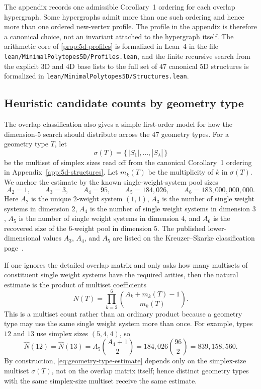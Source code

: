 \begin{remark}
The appendix records one admissible Corollary~1 ordering for each overlap
hypergraph.  Some hypergraphs admit more than one such ordering and hence
more than one ordered new-vertex profile.  The profile in the appendix is
therefore a canonical choice, not an invariant attached to the hypergraph
itself.  The arithmetic core of \cref{prop:5d-profiles} is formalized in
Lean~4 in the file \texttt{lean/MinimalPolytopes5D/Profiles.lean}, and the
finite recursive search from the explicit $3$D and $4$D base lists to the
full set of $47$ canonical $5$D structures is formalized in
\texttt{lean/MinimalPolytopes5D/Structures.lean}.
\end{remark}

\subsection{Heuristic candidate counts by geometry type}
\label{subsec:5d-cws-estimates}

The overlap classification also gives a simple first-order model for how
the dimension-$5$ search should distribute across the $47$ geometry types.
For a geometry type $T$, let
\[
  \sigma(T) = \{\, |S_1|, \dots, |S_\lambda| \,\}
\]
be the multiset of simplex sizes read off from the canonical Corollary~1
ordering in Appendix~\ref{app:5d-structures}.  Let $m_k(T)$ be the
multiplicity of $k$ in $\sigma(T)$.  We anchor the estimate by the known
single-weight-system pool sizes
\begin{equation}
\label{eq:arity-pool-sizes}
  A_2 = 1,\qquad A_3 = 3,\qquad A_4 = 95,\qquad
  A_5 = 184{,}026,\qquad A_6 = 183{,}000{,}000{,}000.
\end{equation}
Here $A_2$ is the unique $2$-weight system $(1,1)$, $A_3$ is the number of
single weight systems in dimension $2$, $A_4$ is the number of single
weight systems in dimension $3$, $A_5$ is the number of single weight
systems in dimension $4$, and $A_6$ is the recovered size of the
$6$-weight pool in dimension $5$.  The published lower-dimensional values
$A_3$, $A_4$, and $A_5$ are listed on the Kreuzer--Skarke classification
page~\cite{KreuzerSkarkeCYcsws}.

If one ignores the detailed overlap matrix and only asks how many multisets
of constituent single weight systems have the required arities, then the
natural estimate is the product of multiset coefficients
\begin{equation}
\label{eq:geometry-type-estimate}
  \widehat N(T)
  = \prod_{k=2}^{6} \binom{A_k + m_k(T) - 1}{m_k(T)}.
\end{equation}
This is a multiset count rather than an ordinary product because a geometry
type may use the same single weight system more than once.  For example,
types $12$ and $13$ use simplex sizes $(5,4,4)$, so
\[
  \widehat N(12) = \widehat N(13)
  = A_5 \binom{A_4 + 1}{2}
  = 184{,}026 \binom{96}{2}
  = 839{,}158{,}560.
\]
By construction, \cref{eq:geometry-type-estimate} depends only on the
simplex-size multiset $\sigma(T)$, not on the overlap matrix itself; hence
distinct geometry types with the same simplex-size multiset receive the
same estimate.

